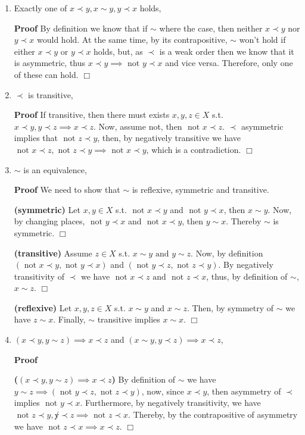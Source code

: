 \documentclass{article}
\theoremstyle{definition}
\def\tand{\text{ and }}
\def\tnot{\text{ not }}
\begin{document}
\begin{enumerate}
\item Exactly one of $x\prec y,x\sim y, y\prec x$ holds,

{\bf Proof} By definition we know that if $\sim$ where the case, then neither $x\prec y$ nor $y\prec x$ would hold.
At the same time, by its contrapositive, $\sim$ won't hold if either $x\prec y$ or $y\prec x$ holds, but, as $\prec$ is a weak order then we know that it is asymmetric, thus $x\prec y\implies \tnot y\prec x$ and vice versa. Therefore, only one of these can hold. $\Box$

\item $\prec$ is transitive,

{\bf Proof} If transitive, then there must exists $x,y,z\in X$ s.t. $x\prec y,y\prec z\implies x\prec z$. Now, assume not, then $\tnot x\prec z$. $\prec$ asymmetric implies that $\tnot z\prec y$, then, by negatively transitive we have $\tnot x\prec z,\tnot z\prec y\implies \tnot x\prec y$, which is a contradiction. $\Box$

\item $\sim$ is an equivalence,

{\bf Proof} We need to show that $\sim$ is reflexive, symmetric and transitive.

{\bf (symmetric)} Let $x,y\in X$ s.t. $\tnot x\prec y$ and $\tnot y\prec x$, then $x\sim y$. Now, by changing places, $\tnot y\prec x$ and $\tnot x\prec y$, then $y\sim x$. Thereby $\sim$ is symmetric. $\Box$

{\bf (transitive)} Assume $z\in X$ s.t. $x\sim y \tand y\sim z$. Now, by definition $(\tnot x\prec y,\tnot y\prec x)$ and $(\tnot y\prec z,\tnot z\prec y)$. By negatively transitivity of $\prec$ we have $\tnot x\prec z\tand \tnot z\prec x$, thus, by definition of $\sim$, $x\sim z$. $\Box$

{\bf (reflexive)} Let $x,y,z\in X$ s.t. $x\sim y$ and $x\sim z$. Then, by symmetry of $\sim$ we have $z\sim x$. Finally, $\sim$ transitive implies $x\sim x$. $\Box$

\item $(x\prec y,y\sim z)\implies x\prec z$ and $(x\sim y,y\prec z)\implies x\prec z$,

{\bf Proof}

{\bf ($(x\prec y,y\sim z)\implies x\prec z$)} By definition of $\sim$ we have $y\sim z\implies (\tnot y\prec z,\tnot z\prec y)$, now, since $x\prec y$, then asymmetry of $\prec$ implies  $\tnot y\prec x$. Furthermore, by negatively transitivity, we have $\tnot z\prec y,\not y\prec z\implies \tnot z\prec x$. Thereby, by the contrapositive of asymmetry we have $\tnot z\prec x\implies x\prec z$. $\Box$


\end{enumerate}
\end{document}
